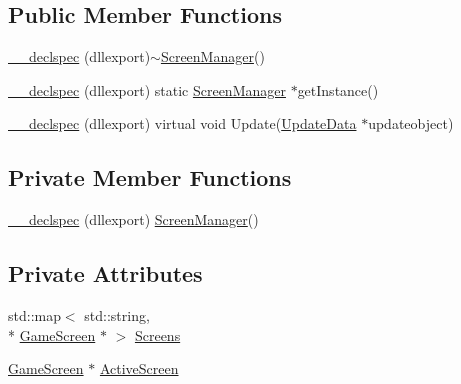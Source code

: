 \subsection*{Public Member Functions}
\begin{DoxyCompactItemize}
\item 
\hyperlink{class_screen_manager_ab348f37f1c0e6324ce57c4fbd3ec7472}{\-\_\-\-\_\-declspec} (dllexport)$\sim$\hyperlink{class_screen_manager}{Screen\-Manager}()
\item 
\hyperlink{class_screen_manager_aef360696d7ab6a1a1c8c19b0b056e2f7}{\-\_\-\-\_\-declspec} (dllexport) static \hyperlink{class_screen_manager}{Screen\-Manager} $\ast$get\-Instance()
\item 
\hyperlink{class_screen_manager_addb9590d63c0182bd97cf537898d0ae2}{\-\_\-\-\_\-declspec} (dllexport) virtual void Update(\hyperlink{class_update_data}{Update\-Data} $\ast$updateobject)
\end{DoxyCompactItemize}
\subsection*{Private Member Functions}
\begin{DoxyCompactItemize}
\item 
\hyperlink{class_screen_manager_aaa33dec76e404bd739a754c80c4917cc}{\-\_\-\-\_\-declspec} (dllexport) \hyperlink{class_screen_manager}{Screen\-Manager}()
\end{DoxyCompactItemize}
\subsection*{Private Attributes}
\begin{DoxyCompactItemize}
\item 
std\-::map$<$ std\-::string, \\*
\hyperlink{class_game_screen}{Game\-Screen} $\ast$ $>$ \hyperlink{class_screen_manager_a54eb2c9667efda525a35d0d7043e8807}{Screens}
\item 
\hyperlink{class_game_screen}{Game\-Screen} $\ast$ \hyperlink{class_screen_manager_abb46941be1b908a2b9d8053409e89597}{Active\-Screen}
\end{DoxyCompactItemize}


